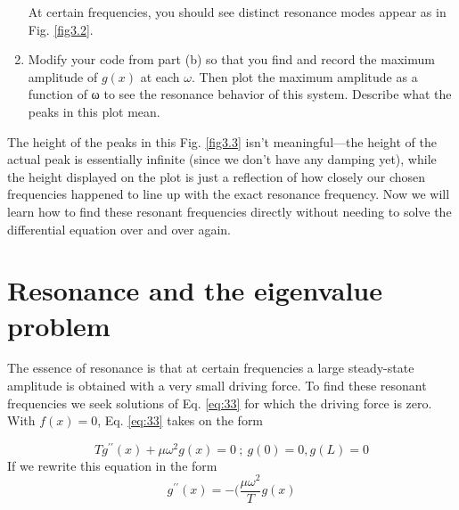 \begin{problem}
\begin{enumerate}[label=(\alph*)]
\begin{lstlisting}
\end{lstlisting}
At certain frequencies, you should see distinct resonance modes appear as in Fig. \ref{fig3.2}.
\item Modify your code from part (b) so that you find and record the maximum amplitude of $g(x)$ at each $\omega$. Then plot the maximum amplitude
as a function of ω to see the resonance behavior of this system. Describe what the peaks in this plot mean.
				
				
\end{enumerate}
\end{problem}

				The height of the peaks in this Fig. \ref{fig3.3} isn\rq t meaningful—the height of the
actual peak is essentially infinite (since we don’t have any damping yet), while
the height displayed on the plot is just a reflection of how closely our chosen
frequencies happened to line up with the exact resonance frequency. Now we will
learn how to find these resonant frequencies directly without needing to solve
the differential equation over and over again.

\section*{Resonance and the eigenvalue problem}
The essence of resonance is that at certain frequencies a large steady-state amplitude is obtained with a very small driving force. To find these resonant frequencies
we seek solutions of Eq. \eqref{eq:33} for which the driving force is zero. With $f(x) = 0$,
Eq. \eqref{eq:33} takes on the form

\begin{equation}\label{eq:35}
		Tg^{\prime\prime}(x) + \mu \omega ^ 2 g(x) = 0 \ ; \ g(0) = 0, g(L) = 0
				\end{equation}
				If we rewrite this equation in the form
				\begin{equation}\label{eq:36}
		g^{\prime\prime}(x) = - (\frac{\mu \omega^2}{T}g(x)
				\end{equation}
				
